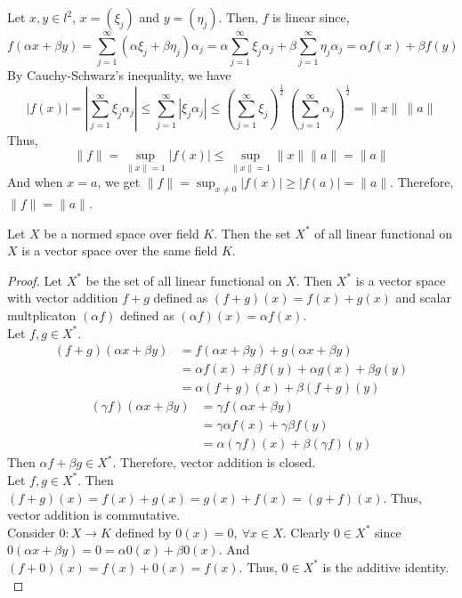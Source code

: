 		Let $x,y \in l^2$, $x = (\xi_j)$ and $y = (\eta_j)$.
		Then, $f$ is linear since,
		\[ f(\alpha x + \beta y) =  \sum_{j = 1}^\infty (\alpha \xi_j+ \beta \eta_j) \alpha_j = \alpha \sum_{j =1}^\infty \xi_j \alpha_j + \beta \sum_{j=1}^\infty \eta_j \alpha_j = \alpha f(x) + \beta f(y) \]
		By Cauchy-Schwarz's inequality, we have
		\[ |f(x)| = \left|\sum_{j=1}^\infty \xi_j \alpha_j \right| \le \sum_{j=1}^\infty |\xi_j \alpha_j| \le \left( \sum_{j=1}^\infty \xi_j \right)^\frac{1}{2}\ \left(\sum_{j=1}^\infty \alpha_j \right)^\frac{1}{2} = \|x\| \ \|a\| \]
		Thus, 
		\[ \|f\| = \sup_{\|x\| = 1} |f(x)| \le \sup_{\|x\| = 1} \|x\|\|a\| = \|a\| \]
		And when $x = a$, we get $\|f\| = \sup_{x \ne 0} |f(x)| \ge |f(a)| = \|a\|$.
		Therefore, $\|f\| = \|a\|$.

\begin{commentary}
\begin{remark}
	Let $X$ be a normed space over field $K$.
	Then the set $X^\ast$ of all linear functional on $X$ is a vector space over the same field $K$.
\end{remark}
\begin{proof}
	Let $X^\ast$ be the set of all linear functional on $X$.
	Then $X^\ast$ is a vector space with vector addition $f+g$ defined as $(f+g)(x) = f(x) + g(x)$ and scalar multplicaton $(\alpha f)$ defined as $(\alpha f)(x) = \alpha f(x)$.\\

	Let $f,g \in X^\ast$.
	\begin{align*}
		(f+g)(\alpha x + \beta y) 
		& = f(\alpha x + \beta y) + g(\alpha x + \beta y) \\
		& = \alpha f(x) + \beta f(y) + \alpha g(x) + \beta g(y) \\
		& = \alpha (f+g)(x) + \beta (f+g)(y)
	\end{align*}
	\begin{align*}
		(\gamma f)(\alpha x + \beta y) 
		& = \gamma f(\alpha x + \beta y) \\
		& = \gamma \alpha f(x) + \gamma \beta f(y) \\
		& = \alpha (\gamma f)(x) + \beta (\gamma f)(y)
	\end{align*}
	Then $\alpha f+ \beta g \in X^\ast$.
	Therefore, vector addition is closed.\\

	Let $f,g \in X^\ast$.
	Then $(f+g)(x) = f(x) + g(x) = g(x) + f(x) = (g+f)(x)$.
	Thus, vector addition is commutative.\\

	Consider $0 : X \to K$ defined by $0(x) = 0,\ \forall x \in X$.
	Clearly $0 \in X^\ast$ since $0(\alpha x + \beta y) = 0 = \alpha 0(x) + \beta 0(x)$.
	And $(f+0)(x) = f(x) + 0(x) = f(x)$.
	Thus, $0 \in X^\ast$ is the additive identity.\\


\end{proof}
\end{commentary}
